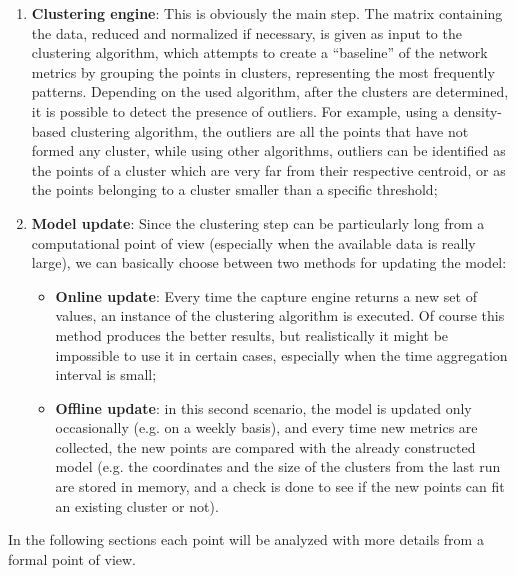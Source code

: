 \documentclass[12pt,a4paper,cucitura]{toptesi}
\begin{document}
\begin{enumerate}
\item \textbf{Clustering engine}: This is obviously the main step. The matrix containing the data, reduced and normalized if necessary, is given as input to the clustering algorithm, which attempts to create a ``baseline'' of the network metrics by grouping the points in clusters, representing the most frequently patterns. Depending on the used algorithm, after the clusters are determined, it is possible to detect the presence of outliers. For example, using a density-based clustering algorithm, the outliers are all the points that have not formed any cluster, while using other algorithms, outliers can be identified as the points of a cluster which are very far from their respective centroid, or as the points belonging to a cluster smaller than a specific threshold;
\item \textbf{Model update}: Since the clustering step can be particularly long from a computational point of view (especially when the available data is really large), we can basically choose between two methods for updating the model:
\begin{itemize}
\item \textbf{Online update}: Every time the capture engine returns a new set of values, an instance of the clustering algorithm is executed. Of course this method produces the better results, but realistically it might be impossible to use it in certain cases, especially when the time aggregation interval is small;
\item \textbf{Offline update}: in this second scenario, the model is updated only occasionally (e.g. on a weekly basis), and every time new metrics are collected, the new points are compared with the already constructed model (e.g. the coordinates and the size of the clusters from the last run are stored in memory, and a check is done to see if the new points can fit an existing cluster or not).
\end{itemize}
\end{enumerate}

In the following sections each point will be analyzed with more details from a formal point of view.
\end{document}

